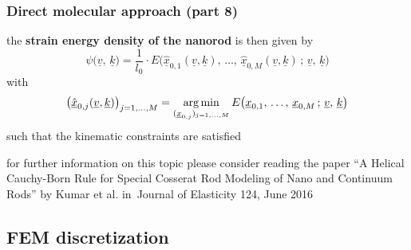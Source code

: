 \begin{frame}
  \frametitle{Direct molecular approach (part 8)}

  the \textbf{strain energy density of the nanorod} is then given by
  \begin{displaymath}
    \psi \bigl( \underline{v}, \, \underline{k} \bigr) =
    \frac{1}{l_0} \cdot E \bigl( \underline{\hat{x}}_{0,1}(\underline{v},\underline{k}), \, \dots, \, \underline{\hat{x}}_{0,M}(\underline{v},\underline{k}) \, ; \, \underline{v}, \, \underline{k} \bigr)
  \end{displaymath}
  with
  \begin{displaymath}
    \bigl( \underline{\hat{x}}_{0,j}(\underline{v},\underline{k}) \bigr)_{j=1,\dots,M}= \operatorname*{\arg \min}_{(\underline{x}_{0,j})_{j=1,\dots,M}} E \bigl( \underline{x}_{0,1}, \, \dots , \, \underline{x}_{0,M} \, ; \, \underline{v}, \, \underline{k} \bigr)
  \end{displaymath}
  such that the kinematic constraints are satisfied
  
  \vspace{1em}
  for further information on this topic please consider reading the paper ``A Helical Cauchy-Born Rule for Special Cosserat Rod Modeling of Nano and Continuum Rods'' by Kumar et al. in Journal of Elasticity 124, June 2016
  
\end{frame}



\subsection{FEM discretization}

